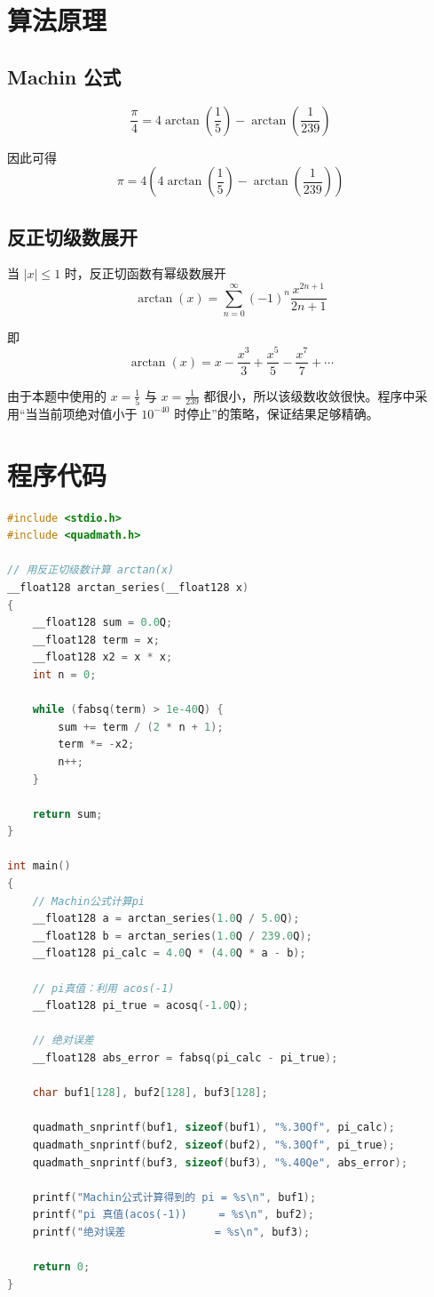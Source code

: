 \documentclass[12pt,a4paper]{article}
\begin{document}
\section{算法原理}

\subsection{Machin 公式}

\[
\frac{\pi}{4}=4\arctan\left(\frac{1}{5}\right)-\arctan\left(\frac{1}{239}\right)
\]

因此可得
\[
\pi = 4\left(4\arctan\left(\frac{1}{5}\right)-\arctan\left(\frac{1}{239}\right)\right)
\]

\subsection{反正切级数展开}

当 $|x|\le 1$ 时，反正切函数有幂级数展开
\[
\arctan(x)=\sum_{n=0}^{\infty}(-1)^n\frac{x^{2n+1}}{2n+1}
\]

即
\[
\arctan(x)=x-\frac{x^3}{3}+\frac{x^5}{5}-\frac{x^7}{7}+\cdots
\]

由于本题中使用的 $x=\frac{1}{5}$ 与 $x=\frac{1}{239}$ 都很小，所以该级数收敛很快。程序中采用“当当前项绝对值小于 $10^{-40}$ 时停止”的策略，保证结果足够精确。

\section{程序代码}

\begin{lstlisting}[language=C]
#include <stdio.h>
#include <quadmath.h>

// 用反正切级数计算 arctan(x)
__float128 arctan_series(__float128 x)
{
    __float128 sum = 0.0Q;
    __float128 term = x;
    __float128 x2 = x * x;
    int n = 0;

    while (fabsq(term) > 1e-40Q) {
        sum += term / (2 * n + 1);
        term *= -x2;
        n++;
    }

    return sum;
}

int main()
{
    // Machin公式计算pi
    __float128 a = arctan_series(1.0Q / 5.0Q);
    __float128 b = arctan_series(1.0Q / 239.0Q);
    __float128 pi_calc = 4.0Q * (4.0Q * a - b);

    // pi真值：利用 acos(-1)
    __float128 pi_true = acosq(-1.0Q);

    // 绝对误差
    __float128 abs_error = fabsq(pi_calc - pi_true);

    char buf1[128], buf2[128], buf3[128];

    quadmath_snprintf(buf1, sizeof(buf1), "%.30Qf", pi_calc);
    quadmath_snprintf(buf2, sizeof(buf2), "%.30Qf", pi_true);
    quadmath_snprintf(buf3, sizeof(buf3), "%.40Qe", abs_error);

    printf("Machin公式计算得到的 pi = %s\n", buf1);
    printf("pi 真值(acos(-1))     = %s\n", buf2);
    printf("绝对误差              = %s\n", buf3);

    return 0;
}
\end{lstlisting}
\end{document}
